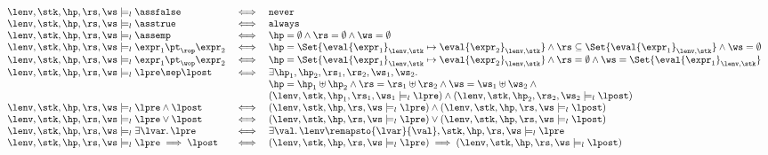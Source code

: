 \[
    \begin{array}{l c l}
        \lenv, \stk, \hp, \rs, \ws \models_{l} \assfalse & \iff & \texttt{never} \\
        \lenv, \stk, \hp, \rs, \ws \models_{l} \asstrue & \iff & \texttt{always} \\
        \lenv, \stk, \hp, \rs, \ws \models_{l} \assemp & \iff & \hp = \emptyset \land \rs = \emptyset \land \ws = \emptyset \\
        \lenv, \stk, \hp, \rs, \ws \models_{l} \expr_{1} \pt_{\rop} \expr_{2} & \iff & \hp = \Set{\eval{\expr_{1}}_{\lenv, \stk} \mapsto \eval{\expr_{2}}_{\lenv, \stk}} \land \rs \subseteq \Set{\eval{\expr_{1}}_{\lenv, \stk}} \land \ws = \emptyset \\
        \lenv, \stk, \hp, \rs, \ws \models_{l} \expr_{1} \pt_{\wop} \expr_{2} & \iff & \hp = \Set{\eval{\expr_{1}}_{\lenv, \stk} \mapsto \eval{\expr_{2}}_{\lenv, \stk}} \land \rs = \emptyset \land \ws = \Set{\eval{\expr_{1}}_{\lenv, \stk}}  \\
        \lenv, \stk, \hp, \rs, \ws \models_{l} \lpre \sep \lpost & \iff & \exists \hp_{1}, \hp_{2}, \rs_{1}, \rs_{2}, \ws_{1}, \ws_{2} \ldotp \\
                                                                 & & \hp = \hp_{1} \uplus \hp_{2} \land \rs = \rs_{1} \uplus \rs_{2} \land \ws = \ws_{1} \uplus \ws_{2} \land {} \\
                                                                 & &  ( \lenv, \stk, \hp_{1}, \rs_{1}, \ws_{1} \models_{l} \lpre ) \land ( \lenv, \stk, \hp_{2}, \rs_{2}, \ws_{2} \models_{l} \lpost ) \\
        \lenv, \stk, \hp, \rs, \ws \models_{l} \lpre \land \lpost & \iff & ( \lenv, \stk, \hp, \rs, \ws \models_{l} \lpre ) \land ( \lenv, \stk, \hp, \rs, \ws \models_{l} \lpost ) \\
        \lenv, \stk, \hp, \rs, \ws \models_{l} \lpre \lor \lpost & \iff & ( \lenv, \stk, \hp, \rs, \ws \models_{l} \lpre ) \lor ( \lenv, \stk, \hp, \rs, \ws \models_{l} \lpost ) \\
        \lenv, \stk, \hp, \rs, \ws \models_{l} \exists \lvar \ldotp \lpre & \iff & \exists \val \ldotp \lenv\remapsto{\lvar}{\val}, \stk, \hp, \rs, \ws \models_{l} \lpre \\
        \lenv, \stk, \hp, \rs, \ws \models_{l} \lpre \implies \lpost & \iff & ( \lenv, \stk, \hp, \rs, \ws \models_{l} \lpre ) \implies ( \lenv, \stk, \hp, \rs, \ws \models_{l} \lpost ) \\
    \end{array}
\]


